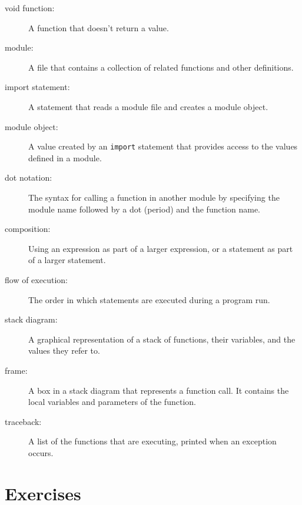 \documentclass[10pt]{book}
\begin{document}
\begin{description}
\item[void function:] A function that doesn't return a value.

\item[module:] A file that contains a
collection of related functions and other definitions.

\item[import statement:] A statement that reads a module file and creates
a module object.

\item[module object:] A value created by an {\tt import} statement
that provides access to the values defined in a module.

\item[dot notation:]  The syntax for calling a function in another
module by specifying the module name followed by a dot (period) and
the function name.

\item[composition:] Using an expression as part of a larger expression,
or a statement as part of a larger statement.

\item[flow of execution:]  The order in which statements are executed during
a program run.

\item[stack diagram:]  A graphical representation of a stack of functions,
their variables, and the values they refer to.

\item[frame:]  A box in a stack diagram that represents a function call.
It contains the local variables and parameters of the function.

\item[traceback:]  A list of the functions that are executing,
printed when an exception occurs.


\end{description}


\section{Exercises}
\end{document}
